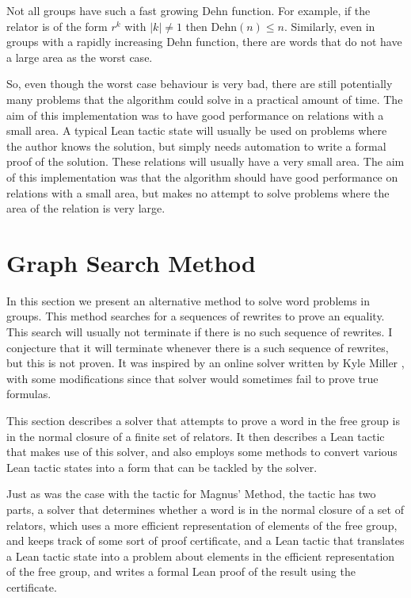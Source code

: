 \documentclass[12pt]{article} %
\theoremstyle{definition}
\theoremstyle{definition}
\theoremstyle{definition}
\theoremstyle{definition}
\begin{document}
  Not all groups have such a fast growing Dehn function. For example, if the relator
  is of the form $r^k$ with $|k| \ne 1$ then $\text{Dehn}(n) \le n$.
  Similarly, even in groups with a rapidly increasing Dehn function,
  there are words that do not have a large area as the worst case.

  So, even though the worst case behaviour is very bad, there are still potentially many
  problems that the algorithm could solve in a practical amount of time. The aim of this
  implementation was to have good performance on relations with a small area.
  A typical Lean tactic state will usually be used on problems where the author knows
  the solution, but simply needs automation to write a formal proof of the solution.
  These relations will usually have a very small area. The aim of this implementation
  was that the algorithm should have good performance on relations with a small area,
  but makes no attempt to solve problems where the area of the relation is very large.

\section{Graph Search Method}\label{gsmethod}

  In this section we present an alternative method to solve word problems in groups.
  This method searches for a sequences of rewrites to prove an equality. This search will
  usually not terminate if there is no such sequence of rewrites. I conjecture that it
  will terminate whenever there is a such sequence of rewrites, but this
  is not proven. It was inspired by an
  online solver written by Kyle Miller \cite{kylemiller}, with some modifications since that solver
  would sometimes fail to prove true formulas.

  This section describes a solver that attempts to prove a word in the free group
  is in the normal closure of a finite set of relators. It then describes
  a Lean tactic that makes use of this solver, and also employs some methods
  to convert various Lean tactic states into a form that can be tackled by
  the solver.

  Just as was the case with the tactic for Magnus' Method, the tactic has two parts,
  a solver that determines whether a word is in the normal closure of a set of relators,
  which uses a more efficient representation of elements of the free group, and keeps track
  of some sort of proof certificate, and a Lean tactic that translates a Lean tactic state
  into a problem about elements in the efficient representation of the free group, and
  writes a formal Lean proof of the result using the certificate.
\end{document}

